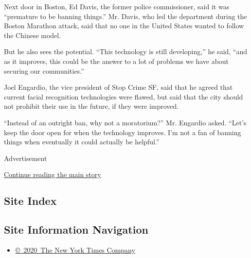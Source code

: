 Next door in Boston, Ed Davis, the former police commissioner, said it
was ``premature to be banning things.'' Mr. Davis, who led the
department during the Boston Marathon attack, said that no one in the
United States wanted to follow the Chinese model.

But he also sees the potential. ``This technology is still developing,''
he said, ``and as it improves, this could be the answer to a lot of
problems we have about securing our communities.''

Joel Engardio, the vice president of Stop Crime SF, said that he agreed
that current facial recognition technologies were flawed, but said that
the city should not prohibit their use in the future, if they were
improved.

``Instead of an outright ban, why not a moratorium?'' Mr. Engardio
asked. ``Let's keep the door open for when the technology improves. I'm
not a fan of banning things when eventually it could actually be
helpful.''

Advertisement

\protect\hyperlink{after-bottom}{Continue reading the main story}

\hypertarget{site-index}{%
\subsection{Site Index}\label{site-index}}

\hypertarget{site-information-navigation}{%
\subsection{Site Information
Navigation}\label{site-information-navigation}}

\begin{itemize}
\tightlist
\item
  \href{https://help.nytimes3xbfgragh.onion/hc/en-us/articles/115014792127-Copyright-notice}{©~2020~The
  New York Times Company}
\end{itemize}

